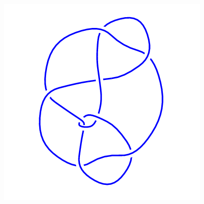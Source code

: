 \begin{figure}[H]
\begin{minipage}[b]{.18\linewidth}
    \end{minipage}
    \begin{minipage}[b]{.18\linewidth}
        \centering
        \includegraphics[width=\linewidth]{../data/9_30.png}
    \end{minipage}
\end{figure}
